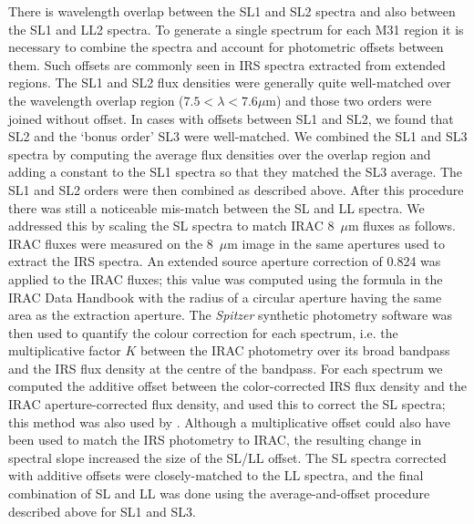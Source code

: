 There is wavelength overlap between the SL1 and SL2 spectra and also between the SL1 and LL2 spectra.
To generate a single spectrum for each M31 region it is necessary to combine the spectra and
account for photometric offsets between them. Such offsets are commonly seen in IRS spectra extracted
from extended regions. 
The SL1 and SL2 flux densities were
generally quite well-matched over the wavelength overlap region ($7.5 < \lambda< 7.6\mu$m)
and those two orders were joined without offset.
In cases with offsets between SL1 and SL2, we found that SL2 and the `bonus order' SL3 were well-matched.
We  combined the  SL1 and SL3 
spectra by computing the average flux densities over the  overlap region and
adding a constant  to the SL1 spectra so that they matched the SL3 average. The SL1 and SL2 orders
were then combined as described above.
After this procedure there was still a noticeable mis-match between the SL and LL spectra. We addressed this
by scaling the SL spectra to match IRAC 8~$\mu$m fluxes as follows. IRAC fluxes were measured
on the 8~$\mu$m image \citep{Barmby2006lr} in the same apertures used to extract the IRS spectra.
An extended source  aperture correction of 0.824 was applied to the IRAC fluxes; this value was computed 
using the formula in the IRAC Data Handbook \citep{SpitzerIIH} with
the radius of a circular aperture having the same area as the extraction aperture.
The {\em Spitzer} synthetic photometry software \citep{SpitzerDAC} 
was then used to quantify the colour correction for each spectrum, i.e. the
multiplicative factor $K$ between the IRAC photometry over its broad bandpass and the IRS flux
density at the centre of the bandpass.  For each spectrum we computed the additive
offset between the color-corrected IRS flux density and the IRAC aperture-corrected flux density,
and used this to correct the SL spectra; this method was also used by \citet{Sandstrom12}.
Although a multiplicative offset could also have been used to match the IRS photometry to IRAC,
the resulting change in spectral slope increased the size of the SL/LL offset.
The SL spectra corrected with additive offsets were closely-matched to the LL spectra, and the final combination
of SL and LL was done using the average-and-offset procedure described above for SL1 and SL3.


